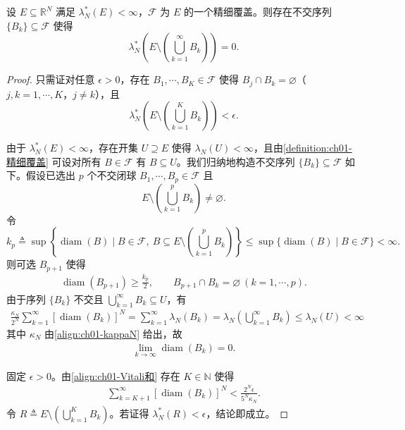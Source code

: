 \documentclass[../../main.tex]{subfiles}%
\begin{document}
\begin{theorem}\label{theorem:ch01-Vitali}
设 $E\subseteq\mathbb{R}^N$ 满足 $\lambda_N^*(E)<\infty$，$\mathcal{F}$ 为 $E$ 的一个精细覆盖。则存在不交序列 $\{B_k\}\subseteq\mathcal{F}$ 使得
\[
\lambda_N^*\left(E\setminus\left(\bigcup_{k=1}^\infty B_k\right)\right)=0.
\]
\end{theorem}

\begin{proof}
只需证对任意 $\epsilon>0$，存在 $B_1,\cdots ,B_K\in\mathcal{F}$ 使得 $B_j\cap B_k=\varnothing $（$j,k=1,\cdots ,K$，$j\neq k$），且
\[
\lambda_N^*\left(E\setminus\left(\bigcup_{k=1}^K B_k\right)\right)<\epsilon.
\]

由于 $\lambda_N^*(E)<\infty$，存在开集 $U\supseteq E$ 使得 $\lambda_N(U)<\infty$，且由\cref{definition:ch01-精细覆盖} 可设对所有 $B\in\mathcal{F}$ 有 $B\subseteq U$。我们归纳地构造不交序列 $\{B_k\}\subseteq\mathcal{F}$ 如下。假设已选出 $p$ 个不交闭球 $B_1,\cdots ,B_p\in\mathcal{F}$ 且
\[
E\setminus\left(\bigcup_{k=1}^p B_k\right)\neq\varnothing .
\]
令
\[
k_p\triangleq \sup\left\{\operatorname{diam}(B)\mid B\in\mathcal{F},\ B\subseteq E\setminus\left(\bigcup_{k=1}^p B_k\right)\right\}
\leqslant\sup\{\operatorname{diam}(B)\mid B\in\mathcal{F}\}<\infty.
\]
则可选 $B_{p+1}$ 使得
\begin{align}
\operatorname{diam}(B_{p+1})\geqslant\frac{k_p}{2},\qquad B_{p+1}\cap B_k=\varnothing \ (k=1,\cdots ,p). \label{align:ch01-Vitali选择}
\end{align}
由于序列 $\{B_k\}$ 不交且 $\bigcup_{k=1}^\infty B_k\subseteq U$，有
\begin{align}
\frac{\kappa_N}{2^N}\sum_{k=1}^\infty[\operatorname{diam}(B_k)]^N
=\sum_{k=1}^\infty\lambda_N(B_k)=\lambda_N\left(\bigcup_{k=1}^\infty B_k\right)
\leqslant\lambda_N(U)<\infty \label{align:ch01-Vitali和}
\end{align}
其中 $\kappa_N$ 由\eqref{align:ch01-kappaN} 给出，故
\begin{align}
\lim_{k\to\infty}\operatorname{diam}(B_k)=0. \label{align:ch01-Vitali直径趋于零}
\end{align}

固定 $\epsilon>0$。由\eqref{align:ch01-Vitali和} 存在 $K\in\mathbb{N}$ 使得
\begin{align}
\sum_{k=K+1}^\infty[\operatorname{diam}(B_k)]^N<\frac{2^N\epsilon}{5^N\kappa_N}. \label{align:ch01-Vitali尾项}
\end{align}
令 $R\triangleq E\setminus\left(\bigcup_{k=1}^K B_k\right)$。若证得 $\lambda_N^*(R)<\epsilon$，结论即成立。


\end{proof}
\end{document}
